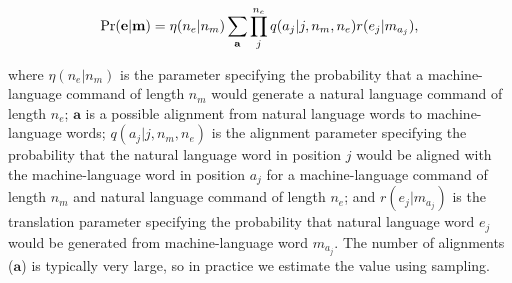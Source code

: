 \documentclass[conference]{IEEEtran}
\begin{document}
{\small
\begin{equation}
\vspace{-1em}
\Pr({\mathbf e} | {\mathbf m}) = \eta(n_e | n_m) \sum_{\mathbf a} \prod_j^{n_e} q(a_j | j, n_m, n_e) r(e_j | m_{a_j}),
\end{equation}
}

\noindent where $\eta(n_e | n_m)$ is the parameter specifying the probability that a machine-language command of length $n_m$%
would generate a natural language command of length $n_e$; %
${\mathbf a}$ is a possible alignment from natural language words to machine-language words; $q(a_j | j, n_m, n_e)$ is the alignment parameter specifying the probability that the natural language word in position $j$ would be aligned with the machine-language word in position $a_j$ for a machine-language command of length $n_m$ and natural language command of length $n_e$;  and $r(e_j | m_{a_j})$ is the translation parameter specifying the probability that natural language word $e_j$ would be generated from machine-language word $m_{a_j}$. The number of alignments (${\mathbf a}$) is typically very large, so in practice we estimate the value using sampling. 
 
\end{document}
